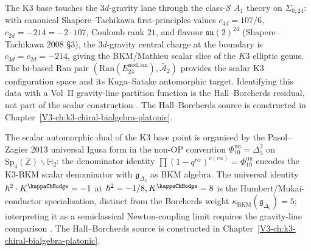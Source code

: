 \begin{remark}
\label{rem:3dgrav-saturation-1}
The K3 base touches the \(3d\)-gravity lane through the class-$\mathcal S$
$A_1$ theory on $\Sigma_{0,24}$: with canonical Shapere--Tachikawa
first-principles values $c_{4d} = 107/6$, $c_{2d} = -214 = -2\cdot 107$,
Coulomb rank $21$, and flavour $\mathfrak{su}(2)^{24}$
\textup{(}Shapere--Tachikawa $2008$ \S 3\textup{)}, the
$3d$-gravity central charge at the boundary is $c_{3d} = c_{2d} = -214$,
giving the BKM/Mathieu scalar slice of the \(K3\) elliptic genus.
The bi-based Ran pair
\((\mathrm{Ran}(E^{\mathrm{nod,sm}}_{24}),\bar{\mathcal A}_2)\)
provides the scalar K3 configuration space and its Kuga--Satake
automorphic target. Identifying this data with a Vol~II
gravity-line partition function is the Hall--Borcherds residual, not
part of the scalar construction
\cite{ChengDuncanHarvey2014,Gaiotto2009,KugaSatake1967}. The
Hall--Borcherds source is constructed in
Chapter~\ref{V3-ch:k3-chiral-bialgebra-platonic}.
\end{remark}

\begin{remark}
\label{rem:3dgrav-saturation-2}
The scalar automorphic dual of the K3 base point is organised by the
Pasol--Zagier 2013 universal Igusa form in the non-OP convention
\(\Phi_{10}^{\mathrm{un}}=\Delta_5^2\) on
\(\mathrm{Sp}_4(\mathbb Z)\backslash\mathbb H_2\):
the denominator identity
$\prod(1-q^{r\alpha})^{c(r\alpha)} = \Phi_{10}^{\mathrm{un}}$
encodes the K3-BKM scalar denominator with
\(\mathfrak g_{\Delta_5}\) as BKM algebra. The universal identity
$\hbar^2\cdot K^{\kappaChHodge} = -1$ at
$\hbar^2 = -1/8, K^{\kappaChHodge} = 8$
is the Humbert/Mukai-conductor specialisation, distinct from the
Borcherds weight $\kappa_{\mathrm{BKM}}(\mathfrak g_{\Delta_5})=5$;
interpreting it as a semiclassical Newton-coupling limit requires the
gravity-line comparison
\cite{PasolZagier2013,Borcherds1992,MaloneyWitten2007}. The
Hall--Borcherds source is constructed in
Chapter~\ref{V3-ch:k3-chiral-bialgebra-platonic}.
\end{remark}
